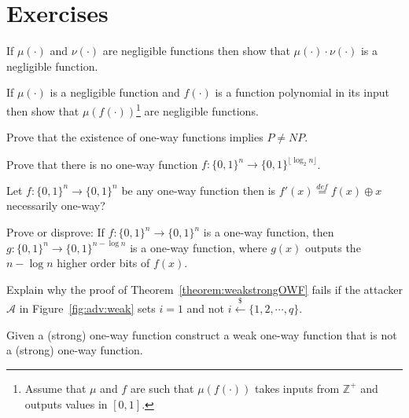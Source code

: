 \newpage
\section*{Exercises}
\begin{exercise}
\label{ex:product} If $\mu(\cdot)$ and $\nu(\cdot)$ are negligible functions then show that $\mu(\cdot) \cdot \nu(\cdot)$ is a negligible function.
\end{exercise}

\begin{exercise}
\label{ex:product} If $\mu(\cdot)$ is a negligible function and $f(\cdot)$ is a function polynomial in its input then show that $\mu(f(\cdot))$\footnote{Assume that $\mu$ and $f$ are such that $\mu(f(\cdot))$ takes inputs from $\mathbb{Z}^+$ and outputs values in $[0,1]$.} are negligible functions.
\end{exercise}

\begin{exercise}\label{ex:PNP} Prove that the existence of one-way functions implies $P \neq NP$.
\end{exercise}

\begin{exercise}
Prove that there is no one-way function $f:\{0,1\}^n\to \{0,1\}^{\lfloor \log_2 n\rfloor}$.
\end{exercise}


\begin{exercise} Let $f:\{0,1\}^n\to \{0,1\}^{n}$ be any one-way function then is $f'(x) \stackrel{def}{=} f(x)\oplus x$ necessarily one-way?
\end{exercise}

\begin{exercise}
Prove or disprove: If $f: \{0,1\}^n\rightarrow \{0,1\}^n$ is a one-way function, then $g: \{0,1\}^n\rightarrow \{0,1\}^{n-\log n}$ is a one-way function, where $g(x)$ outputs the $n-\log n$ higher order bits of $f(x)$.
\end{exercise}

\begin{exercise}
Explain why the proof of Theorem~\ref{theorem:weakstrongOWF} fails if the attacker $\mathcal{A}$ in Figure~\ref{fig:adv:weak} sets $i = 1$ and not $i \stackrel{\$}{\leftarrow} \{1, 2, \cdots, q\}$.
\end{exercise}

\begin{exercise}
Given a (strong) one-way function construct a weak one-way function that is not a (strong) one-way function.
\end{exercise}

